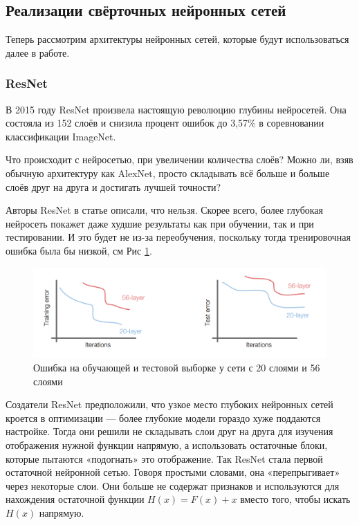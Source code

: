 \subsection{Реализации свёрточных нейронных сетей} \label{nn_archs_lit}
Теперь рассмотрим архитектуры нейронных сетей, которые будут использоваться далее в работе.

\subsubsection{ResNet} \label{resnet_rev}

В 2015 году ResNet произвела настоящую революцию глубины нейросетей. Она состояла из 152 слоёв и снизила процент ошибок до 3,57\%\cite{resnet} в соревновании классификации ImageNet.

Что происходит с нейросетью, при увеличении количества слоёв? Можно ли, взяв обычную архитектуру как AlexNet, просто складывать всё больше и больше слоёв друг на друга и достигать лучшей точности? 

Авторы ResNet в статье описали, что нельзя. Скорее всего, более глубокая нейросеть покажет даже худшие результаты как при обучении, так и при тестировании. И это будет не из-за переобучения, поскольку тогда тренировочная ошибка была бы низкой, см Рис \ref{fig:train_error_deep_net}.

\begin{figure} [h]
    \centering
    \includegraphics[width=\textwidth*2/3]{images/train_error_deep_net.png}
    \caption{Ошибка на обучающей и тестовой выборке у сети с 20 слоями и 56 слоями}
    \label{fig:train_error_deep_net}
\end{figure}

Создатели ResNet предположили, что узкое место глубоких нейронных сетей кроется в оптимизации — более глубокие модели гораздо хуже поддаются настройке. Тогда они решили не складывать слои друг на друга для изучения отображения нужной функции напрямую, а использовать остаточные блоки, которые пытаются «подогнать» это отображение. Так ResNet стала первой остаточной нейронной сетью\cite{resnet}. Говоря простыми словами, она «перепрыгивает» через некоторые слои. Они больше не содержат признаков и используются для нахождения остаточной функции $H(x) = F(x) + x$ вместо того, чтобы искать $H(x)$ напрямую.

